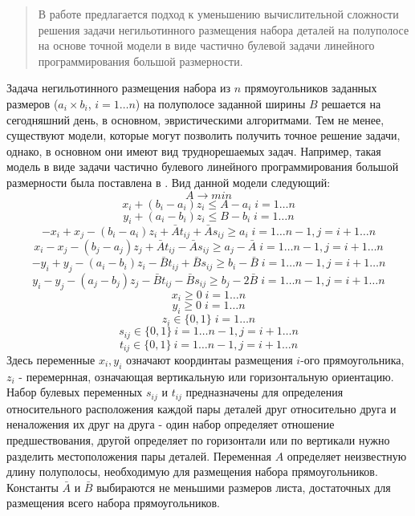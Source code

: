 
\maketitle

\begin{abstract}
В работе предлагается подход к уменьшению вычислительной сложности решения задачи негильотинного размещения набора деталей на полуполосе на основе точной модели в виде частично булевой задачи линейного программирования большой размерности.

\end{abstract}

Задача негильотинного размещения набора из $n$ прямоугольников заданных размеров ($a_i \times b_i$, $i=1\ldots n$) на полуполосе заданной ширины $B$ решается на сегодняшний день, в основном, эвристическими алгоритмами. Тем не менее, существуют модели, которые могут позволить получить точное решение задачи, однако, в основном они имеют вид труднорешаемых задач. Например, такая модель в виде задачи частично булевого линейного программирования большой размерности была поставлена в \cite{Andr_Faz_Much}. Вид данной модели следующий:
$$A\to min$$
$$x_i +(b_i-a_i)z_i\le A-a_i \;  i=1\ldots n$$
$$y_i +(a_i-b_i)z_i\le B-b_i \; i=1\ldots n$$
$$-x_i+x_j -(b_i-a_i)z_i +\bar{A}t_{ij}+\bar{A}s_{ij}\ge a_i \; i=1\ldots n-1, j=i+1\ldots n $$
$$x_i-x_j -(b_j-a_j)z_j +\bar{A}t_{ij}-\bar{A}s_{ij}\ge a_j-\bar{A} \; i=1\ldots n-1, j=i+1\ldots n $$
$$-y_i+y_j -(a_i-b_i)z_i -\bar{B}t_{ij}+\bar{B}s_{ij}\ge b_i-\bar{B} \; i=1\ldots n-1, j=i+1\ldots n $$
$$y_i-y_j -(a_j-b_j)z_j -\bar{B}t_{ij}-\bar{B}s_{ij}\ge b_j-2\bar{B} \; i=1\ldots n-1, j=i+1\ldots n $$
$$x_i \ge 0 \; i=1\ldots n$$
$$y_i \ge 0 \; i=1\ldots n$$
$$z_i \in\{0,1\} \; i=1\ldots n$$
$$s_{ij}\in \{0,1\} \: i=1\ldots n-1, j=i+1\ldots n$$
$$t_{ij}\in \{0,1\} \: i=1\ldots n-1, j=i+1\ldots n$$
%
Здесь переменные $x_i, y_i$ означают координтаы размещения $i$-ого прямоугольника, $z_i$ - перемернная, означающая вертикальную или горизонтальную ориентацию. Набор булевых переменных $s_{ij}$ и $t_{ij}$ предназначены для определения относительного расположения каждой пары деталей друг относительно друга и неналожения их друг на друга - один набор определяет отношение предшествования, другой определяет по горизонтали или по вертикали нужно разделить местоположения пары деталей. Переменная $A$ определяет неизвестную длину полуполосы, необходимую для размещения набора прямоугольников. Константы $\bar{A}$ и $\bar{B}$ выбираются не меньшими размеров листа, достаточных для размещения всего набора прямоугольников.

